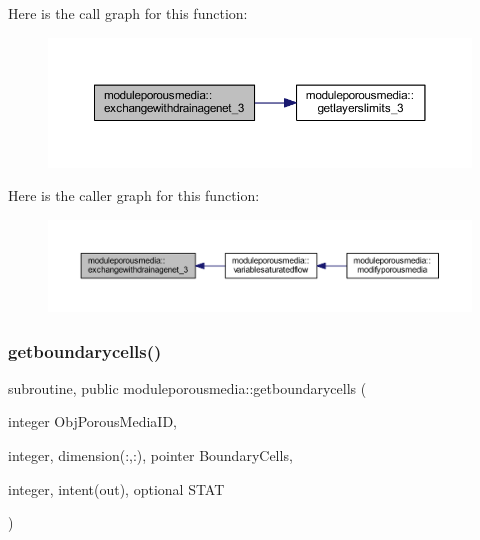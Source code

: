 Here is the call graph for this function\+:\nopagebreak
\begin{figure}[H]
\begin{center}
\leavevmode
\includegraphics[width=350pt]{namespacemoduleporousmedia_a3a50b72fe18c884e4924b75c7d58d2c6_cgraph}
\end{center}
\end{figure}
Here is the caller graph for this function\+:\nopagebreak
\begin{figure}[H]
\begin{center}
\leavevmode
\includegraphics[width=350pt]{namespacemoduleporousmedia_a3a50b72fe18c884e4924b75c7d58d2c6_icgraph}
\end{center}
\end{figure}
\mbox{\label{namespacemoduleporousmedia_a791a426544d46967cd83d7b81926e26a}} 
\subsubsection{\texorpdfstring{getboundarycells()}{getboundarycells()}}
{\footnotesize\ttfamily subroutine, public moduleporousmedia\+::getboundarycells (\begin{DoxyParamCaption}\item[{integer}]{Obj\+Porous\+Media\+ID,  }\item[{integer, dimension(\+:,\+:), pointer}]{Boundary\+Cells,  }\item[{integer, intent(out), optional}]{S\+T\+AT }\end{DoxyParamCaption})}

